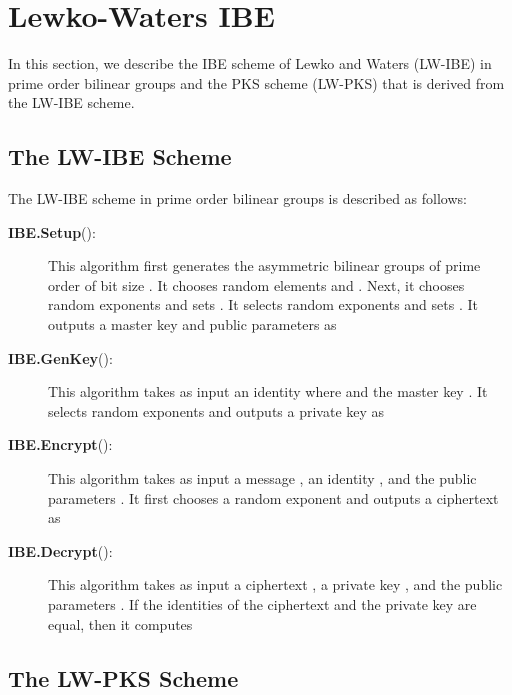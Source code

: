 \documentclass[11pt,letterpaper]{article}
\begin{document}



\appendix

\section{Lewko-Waters IBE} \label{sec:lw-ibe}

In this section, we describe the IBE scheme of Lewko and Waters (LW-IBE)
\cite{LewkoW10} in prime order bilinear groups and the PKS scheme (LW-PKS)
that is derived from the LW-IBE scheme.

\subsection{The LW-IBE Scheme}

The LW-IBE scheme in prime order bilinear groups is described as follows:

\begin{description}
\item [\textbf{IBE.Setup}():] This algorithm first generates the
    asymmetric bilinear groups  of prime order  of bit
    size . It chooses random elements  and
    . Next, it chooses random exponents
     and sets .
    It selects random exponents  and sets . It outputs a master
    key  and public parameters as
    

\item [\textbf{IBE.GenKey}():] This algorithm takes as input an
    identity  where  and the master key .
    It selects random exponents  and outputs a
    private key as
    

\item [\textbf{IBE.Encrypt}():] This algorithm takes as input a
    message , an identity , and the public parameters .
    It first chooses a random exponent  and outputs a
    ciphertext as
    

\item [\textbf{IBE.Decrypt}():] This algorithm takes as
    input a ciphertext , a private key , and the public
    parameters . If the identities of the ciphertext and the private
    key are equal, then it computes
    
\end{description}

\subsection{The LW-PKS Scheme}
\end{document}
